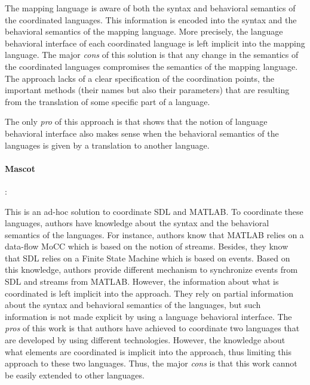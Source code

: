 The mapping language is aware of both the syntax and behavioral semantics of the coordinated languages. This information is encoded into the syntax and the behavioral semantics of the mapping language. More precisely, the language behavioral interface of each coordinated language is left implicit into the mapping language. The major \emph{cons} of this solution is that any change in the semantics of the coordinated languages compromises the semantics of the mapping language. The approach lacks of a clear specification of the coordination points, \ie the important methods (their names but also their parameters) that are resulting from the translation of some specific part of a language. 

The only \emph{pro} of this approach is that shows that the notion of language behavioral interface also makes sense when the behavioral semantics of the languages is given by a translation to another language.

 
 
{\paragraph{Mascot~\cite{mascotbib}}:}
This is an ad-hoc solution to coordinate SDL and MATLAB. To coordinate these languages, authors have knowledge about the syntax and the behavioral semantics of the languages. For instance, authors know that MATLAB relies on a data-flow MoCC which is based on the notion of streams. Besides, they know that SDL relies on a Finite State Machine which is based on events. Based on this knowledge, authors provide different mechanism to synchronize events from SDL and streams from MATLAB. However, the information about what is coordinated is left implicit into the approach. They rely on partial information about the syntax and behavioral semantics of the languages, but such information is not made explicit by using a language behavioral interface. The \emph{pros} of this work is that authors have achieved to coordinate two languages that are developed by using different technologies. However, the knowledge about what elements are coordinated is implicit into the approach, thus limiting this approach to these two languages. Thus, the major \emph{cons} is that this work cannot be easily extended to other languages. 
	
